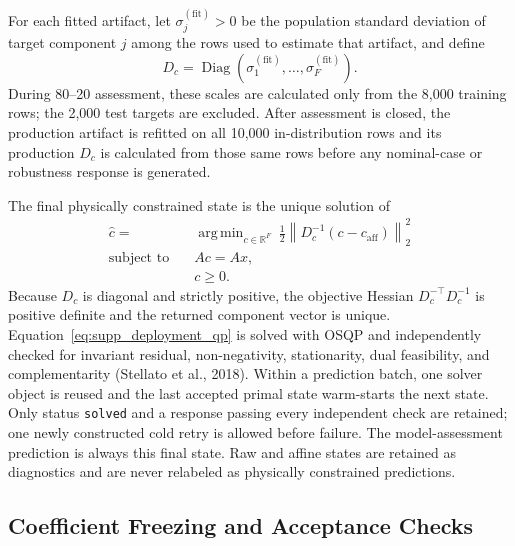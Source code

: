 \documentclass[a4paper,fleqn]{cas-sc}
\DeclareMathOperator*{\argminop}{arg\,min}
\newcommand{\R}{\mathbb{R}}
\begin{document}
For each fitted artifact, let $\sigma_j^{(\mathrm{fit})}>0$ be the population standard deviation of target component $j$ among the rows used to estimate that artifact, and define
\begin{equation}
D_c=\operatorname{Diag}
\left(\sigma_1^{(\mathrm{fit})},\ldots,\sigma_F^{(\mathrm{fit})}\right).
\end{equation}
During 80--20 assessment, these scales are calculated only from the 8,000 training rows; the 2,000 test targets are excluded. After assessment is closed, the production artifact is refitted on all 10,000 in-distribution rows and its production $D_c$ is calculated from those same rows before any nominal-case or robustness response is generated.

The final physically constrained state is the unique solution of
\begin{equation}
\label{eq:supp_deployment_qp}
\begin{aligned}
\widehat c={}&
\argminop_{c\in\R^F}\ \frac12
\left\|D_c^{-1}(c-c_{\mathrm{aff}})\right\|_2^2\\
\text{subject to}\quad&Ac=Ax,\\
&c\geq0.
\end{aligned}
\end{equation}
Because $D_c$ is diagonal and strictly positive, the objective Hessian $D_c^{-\top}D_c^{-1}$ is positive definite and the returned component vector is unique. Equation~\eqref{eq:supp_deployment_qp} is solved with OSQP and independently checked for invariant residual, non-negativity, stationarity, dual feasibility, and complementarity (Stellato et al., 2018). Within a prediction batch, one solver object is reused and the last accepted primal state warm-starts the next state. Only status \texttt{solved} and a response passing every independent check are retained; one newly constructed cold retry is allowed before failure. The model-assessment prediction is always this final state. Raw and affine states are retained as diagnostics and are never relabeled as physically constrained predictions.

\subsection{Coefficient Freezing and Acceptance Checks}
\end{document}
